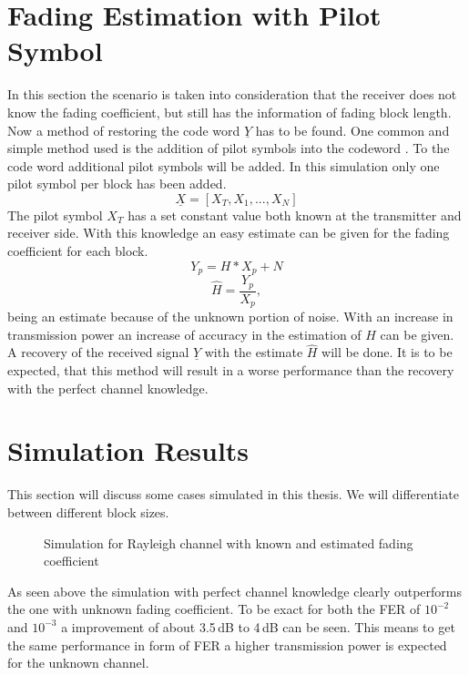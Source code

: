 \section{Fading Estimation with Pilot Symbol}
In this section the scenario is taken into consideration that the receiver does not know the fading coefficient, but still has the information of fading block length. Now a method of restoring the code word \textbf{$\underline{Y}$} has to be found.
\newline
One common and simple method used is the addition of pilot symbols into the codeword \cite{Hassibi03}. To the code word additional pilot symbols will be added. In this simulation only one pilot symbol per block has been added. 
\begin{equation}
\underline{X} = [X_T, X_1, ..., X_N]
\end{equation}
The pilot symbol $X_T$ has a set constant value both known at the transmitter and receiver side. With this knowledge an easy estimate can be given for the fading coefficient for each block.
\begin{equation}
Y_p = H * X_p + N
\end{equation}
\begin{equation}
\hat{H} = \frac{Y_p}{X_p},
\end{equation}
being an estimate because of the unknown portion of noise. With an increase in transmission power an increase of accuracy in the estimation of $H$ can be given.
A recovery of the received signal \textbf{$\underline{Y}$} with the estimate \textbf{$\hat{H}$} will be done. It is to be expected, that this method will result in a worse performance than the recovery with the perfect channel knowledge. 

\section{Simulation Results}
This section will discuss some cases simulated in this thesis. We will differentiate between different block sizes.
\begin{figure}[!htb]
	\setlength{}
	\setlength\fheight{0.4\textheight}
	\centering
		
	\caption{Simulation for Rayleigh channel with known and estimated fading coefficient}
	\label{fig:rayferfirst}
\end{figure}

As seen above the simulation with perfect channel knowledge clearly outperforms the one with unknown fading coefficient. To be exact for both the \gls{FER} of $10^{-2}$ and $10^{-3}$ a improvement of about 3.5\,dB to 4\,dB can be seen. This means to get the same performance in form of \gls{FER} a higher transmission power is expected for the unknown channel.

